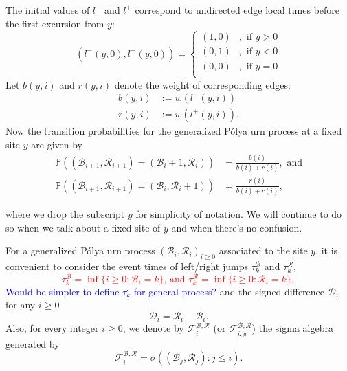 \documentclass[twoside,12pt,a4paper]{article}
\numberwithin{equation}{section}
\newcommand{\edt}[1]{\textcolor{red}{#1}} %
\newcommand{\comment}[1]{\textcolor{blue}{#1}}
\begin{document}
	The initial values of $l^-$ and $l^+$ correspond to undirected edge local times before the first excursion from $y $:
	\[
		\left(l^-(y,0),l^+(y,0)\right) =  \begin{cases}	
		(1, 0) &,  \text{ if }  y>0 \\
		(0, 1) &,  \text{ if }  y<0 \\  
		(0, 0) &,  \text{ if }  y=0 \\ 
	\end{cases}
\] 
	Let $b(y,i)$ and $r(y,i)$ denote the weight of corresponding edges:
	\begin{align*}
		b(y,i) &:= w(l^-(y,i)) \\
		r(y,i) &:= w(l^+(y,i))
	.\end{align*}
	Now the transition probabilities
	for the generalized P\'{o}lya urn process at a fixed site $y$ are given by
	\begin{align*}\label{eq: transition prob for GPU}
		\mathbb{P} \left( \left(\mathcal{B}_{i+1},\mathcal{R}_{i+1}\right)=   \left(\mathcal{B}_{i}+1,\mathcal{R}_{i}\right) \right)     &= \frac{b(i)}{b(i)+r(i)}, \mbox{ and}  \\
		\mathbb{P} \left( \left(\mathcal{B}_{i+1},\mathcal{R}_{i+1}\right)=   \left(\mathcal{B}_{i},\mathcal{R}_{i}+1\right) \right)     &= \frac{r(i)}{b(i)+r(i)},
	\end{align*} 


	where we drop the subscript $y$ for simplicity of notation. We will continue to do so when we talk about a fixed site of $y$ and when there's no confusion.

	For a generalized P\'{o}lya urn process $(\mathcal{B}_i,\mathcal{R}_i )_{i\geq 0}$ associated to the site $y$, it is convenient to consider the event times of left/right jumps $\tau^\mathcal{B}_k$ and $ \tau^\mathcal{R}_k $,	
	\edt{
		$$ \tau^\mathcal{B}_k = \inf\{ i\geq 0: \mathcal{B}_{i} =k   \}  \mbox{, and } \tau^\mathcal{R}_k = \inf\{ i\geq 0: \mathcal{R}_{i} =k   \} ,
	$$
}
	\comment{Would be simpler to define $\tau^\cdot_k$ for general process?}
	and the signed difference $\mathcal{D}_{i} $ for any $i\geq 0$
	\begin{equation}\label{eq:signed difference}
		\mathcal{D}_i  =\mathcal{R}_i -\mathcal{B}_i.  
	\end{equation}
	Also, for every integer $i\geq 0$, we denote by $\mathcal{F}^{\mathcal{B},\mathcal{R}}_i$ (or $\mathcal{F}^{\mathcal{B},\mathcal{R}}_{i,y}$) the sigma algebra generated by  
	\[
	\mathcal{F}^{\mathcal{B},\mathcal{R}}_i = \sigma\left(\left(\mathcal{B}_j,\mathcal{R}_j \right): j\leq i \right)
	.\]  
	
\end{document}
